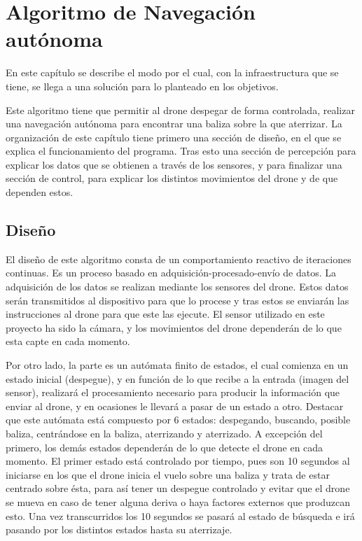 \chapter{Algoritmo de Navegaci\'on aut\'onoma}\label{cap.algoritmo} %

\hspace{1 cm} En este cap\'itulo se describe el modo por el cual, con la infraestructura que se tiene, se llega a una soluci\'on para lo planteado en los objetivos. 

\hspace{1 cm} Este algoritmo tiene que permitir al drone despegar de forma controlada, realizar una navegaci\'on aut\'onoma para encontrar una baliza sobre la que aterrizar. La organizaci\'on de este cap\'itulo tiene primero una secci\'on de diseño, en el que se explica el funcionamiento del programa. Tras esto una secci\'on de percepci\'on para explicar los datos que se obtienen a trav\'es de los sensores, y para finalizar una secci\'on de control, para explicar los distintos movimientos del drone y de que dependen estos. %

\section{Diseño}
\label{sec.Design}

\hspace{1 cm} El diseño de este algoritmo consta de un comportamiento reactivo de iteraciones continuas. Es un proceso basado en adquisici\'on-procesado-env\'io de datos. La adquisici\'on de los datos se realizan mediante los sensores del drone. Estos datos ser\'an transmitidos al dispositivo para que lo procese y tras estos se enviar\'an las instrucciones al drone para que este las ejecute. El sensor utilizado en este proyecto ha sido la c\'amara, y los movimientos del drone depender\'an de lo que esta capte en cada momento. 

\hspace{1 cm} Por otro lado, la parte es un aut\'omata finito de estados, el cual comienza en un estado inicial (despegue), y en funci\'on de lo que recibe a la entrada (imagen del sensor), realizar\'a el procesamiento necesario para producir la informaci\'on que enviar al drone, y en ocasiones le llevar\'a a pasar de un estado a otro. Destacar que este aut\'omata est\'a compuesto por 6 estados: despegando, buscando, posible baliza, centr\'andose en la baliza, aterrizando y aterrizado. A excepci\'on del primero, los dem\'as estados depender\'an de lo que detecte el drone en cada momento. El primer estado est\'a controlado por tiempo, pues son 10 segundos al iniciarse en los que el drone inicia el vuelo sobre una baliza y trata de estar centrado sobre \'esta, para as\'i tener un despegue controlado y evitar que el drone se mueva en caso de tener alguna deriva o haya factores externos que produzcan esto. Una vez transcurridos los 10 segundos se pasar\'a al estado de b\'usqueda e ir\'a pasando por los distintos estados hasta su aterrizaje. 

